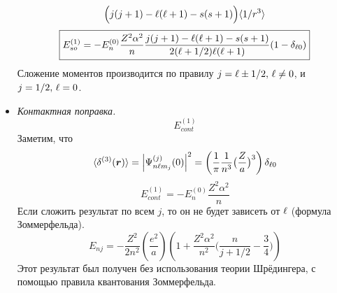 \begin{itemize}
\begin{eqnarray*}
    \Big(
        j(j+1) - \ell(\ell+1) - s(s+1)
    \Big) \langle 1/r^3 \rangle
  \end{eqnarray*}
  $$
    \boxed{
        E_{so}^{(1)} = - E_n^{(0)} \dfrac{Z^2 \alpha^2}{n} 
        \dfrac
        {j(j+1) - \ell(\ell+1) - s(s+1)}
        {2(\ell+1/2) \ell (\ell+1)}
        (1 - \delta_{\ell 0})
    }
  $$
  Сложение моментов производится по правилу $j = \ell \pm 1/2, \, \ell \ne 0$, и $j = 1/2, \, \ell = 0$.
  \item \emph{Контактная поправка.}
  $$
    E_{cont}^{(1)} 
  $$
  Заметим, что
  $$
    \langle \delta^{(3)} (\boldsymbol r) \rangle = \Big|
        \Psi^{(j)}_{n \ell m_j} (0)
    \Big|^2 = \left(
        \dfrac{1}{\pi} \dfrac{1}{n^3} \big(
            \dfrac{Z}{a}
        \big)^3
    \right) \delta_{\ell 0}
  $$
  $$
    \boxed{
        E_{cont}^{(1)} = - E_n^{(0)} \dfrac{Z^2 \alpha^2}{n}
    }
  $$
  Если сложить результат по всем $j$, то он не будет зависеть от $\ell$ (формула Зоммерфельда).
  $$
    \boxed{
        E_{nj} = -\dfrac{Z^2}{2n^2} \left(
            \dfrac{e^2}{a}
        \right) \left(
            1 + \dfrac{Z^2 \alpha^2}{n^2} \big(
                \dfrac{n}{j + 1/2} - \dfrac34
            \big)
        \right)
    }
  $$
  Этот результат был получен без использования теории Шрёдингера, с помощью правила квантования Зоммерфельда.
\end{itemize}
